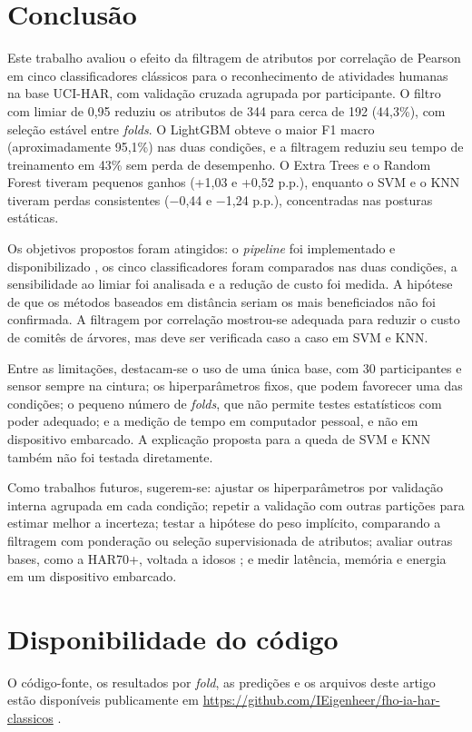 \documentclass[conference]{IEEEtran}
\begin{document}
\section{Conclusão}
\label{sec:conclusao}
Este trabalho avaliou o efeito da filtragem de atributos por correlação de Pearson em cinco classificadores clássicos para o reconhecimento de atividades humanas na base UCI-HAR, com validação cruzada agrupada por participante. O filtro com limiar de 0,95 reduziu os atributos de 344 para cerca de 192 (44,3\%), com seleção estável entre \textit{folds}. O LightGBM obteve o maior F1 macro (aproximadamente 95,1\%) nas duas condições, e a filtragem reduziu seu tempo de treinamento em 43\% sem perda de desempenho. O Extra Trees e o Random Forest tiveram pequenos ganhos (+1,03 e +0,52 p.p.), enquanto o SVM e o KNN tiveram perdas consistentes ($-$0,44 e $-$1,24 p.p.), concentradas nas posturas estáticas.

Os objetivos propostos foram atingidos: o \textit{pipeline} foi implementado e disponibilizado \cite{Repositorio}, os cinco classificadores foram comparados nas duas condições, a sensibilidade ao limiar foi analisada e a redução de custo foi medida. A hipótese de que os métodos baseados em distância seriam os mais beneficiados não foi confirmada. A filtragem por correlação mostrou-se adequada para reduzir o custo de comitês de árvores, mas deve ser verificada caso a caso em SVM e KNN.

Entre as limitações, destacam-se o uso de uma única base, com 30 participantes e sensor sempre na cintura; os hiperparâmetros fixos, que podem favorecer uma das condições; o pequeno número de \textit{folds}, que não permite testes estatísticos com poder adequado; e a medição de tempo em computador pessoal, e não em dispositivo embarcado. A explicação proposta para a queda de SVM e KNN também não foi testada diretamente.

Como trabalhos futuros, sugerem-se: ajustar os hiperparâmetros por validação interna agrupada em cada condição; repetir a validação com outras partições para estimar melhor a incerteza; testar a hipótese do peso implícito, comparando a filtragem com ponderação ou seleção supervisionada de atributos; avaliar outras bases, como a HAR70+, voltada a idosos \cite{HAR70}; e medir latência, memória e energia em um dispositivo embarcado.

\section*{Disponibilidade do código}
O código-fonte, os resultados por \textit{fold}, as predições e os arquivos deste artigo estão disponíveis publicamente em \url{https://github.com/IEigenheer/fho-ia-har-classicos} \cite{Repositorio}.


\balance


\end{document}
